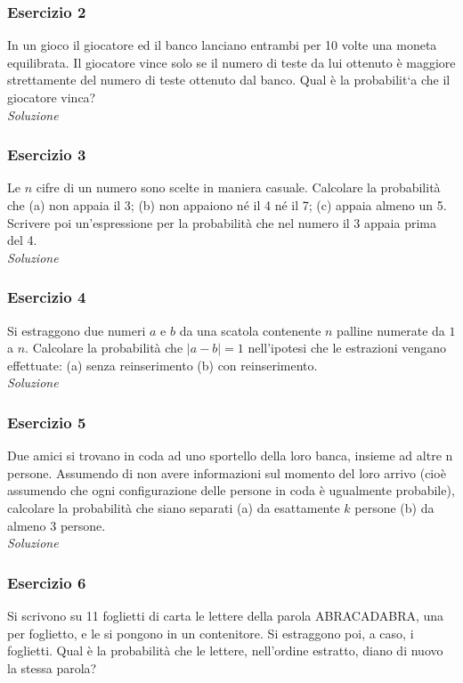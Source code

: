 \subsubsection{Esercizio 2}
In un gioco il giocatore ed il banco lanciano entrambi per 10 volte una moneta equilibrata. Il giocatore vince solo se il numero di teste da lui ottenuto è maggiore strettamente del numero di teste ottenuto dal banco. Qual è la probabilit`a che il giocatore vinca?
\\



\textit{Soluzione}  



\subsubsection{Esercizio 3}
Le $n$ cifre di un numero sono scelte in maniera casuale. Calcolare la probabilità che
(a) non appaia il 3;
(b) non appaiono né il 4 né il 7; (c) appaia almeno un 5.
Scrivere poi un’espressione per la probabilità che nel numero il 3 appaia prima del 4.
\\

\textit{Soluzione} \quad 

\subsubsection{Esercizio 4} Si estraggono due numeri $a$ e $b$ da una scatola contenente $n$ palline numerate da $1$ a $n$. Calcolare la probabilità che $|a-b| = 1$ nell’ipotesi che le estrazioni vengano effettuate:
(a) senza reinserimento (b) con reinserimento.
\\

\textit{Soluzione} \quad 

\subsubsection{Esercizio 5} Due amici si trovano in coda ad uno sportello della loro banca, insieme ad altre n persone. Assumendo di non avere informazioni sul momento del loro arrivo (cioè assumendo che ogni configurazione delle persone in coda è ugualmente probabile), calcolare la probabilità che siano separati
(a) da esattamente $k$ persone (b) da almeno 3 persone.
\\

\textit{Soluzione} \quad 

\subsubsection{Esercizio 6} Si scrivono su 11 foglietti di carta le lettere della parola ABRACADABRA, una per foglietto, e le si pongono in un contenitore. Si estraggono poi, a caso, i foglietti. Qual è la probabilità che le lettere, nell’ordine estratto, diano di nuovo la stessa parola?
\\

